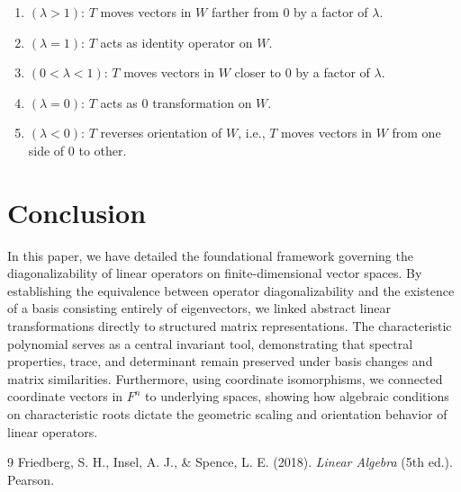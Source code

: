 \documentclass[12pt, a4paper]{article}
\theoremstyle{definition}
\theoremstyle{remark}
\begin{document}
\begin{enumerate}
    \item $(\lambda > 1)$: $T$ moves vectors in $W$ farther from $0$ by a factor of $\lambda$.
    \item $(\lambda = 1)$: $T$ acts as identity operator on $W$.
    \item $(0 < \lambda < 1)$: $T$ moves vectors in $W$ closer to $0$ by a factor of $\lambda$.
    \item $(\lambda = 0)$: $T$ acts as $0$ transformation on $W$.
    \item $(\lambda < 0)$: $T$ reverses orientation of $W$, i.e., $T$ moves vectors in $W$ from one side of $0$ to other.
\end{enumerate}

\section{Conclusion}
In this paper, we have detailed the foundational framework governing the diagonalizability of linear operators on finite-dimensional vector spaces. By establishing the equivalence between operator diagonalizability and the existence of a basis consisting entirely of eigenvectors, we linked abstract linear transformations directly to structured matrix representations. The characteristic polynomial serves as a central invariant tool, demonstrating that spectral properties, trace, and determinant remain preserved under basis changes and matrix similarities. Furthermore, using coordinate isomorphisms, we connected coordinate vectors in $F^n$ to underlying spaces, showing how algebraic conditions on characteristic roots dictate the geometric scaling and orientation behavior of linear operators.  
\begin{thebibliography}{9}
    Friedberg, S. H., Insel, A. J., \& Spence, L. E. (2018). \textit{Linear Algebra} (5th ed.). Pearson.
\end{thebibliography}
\end{document}
